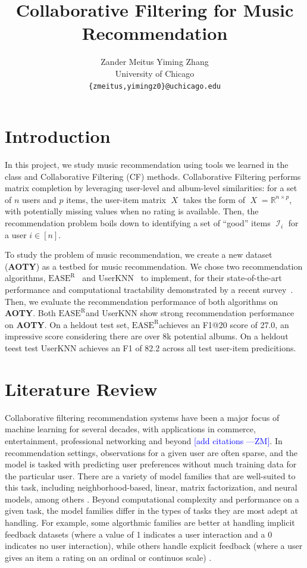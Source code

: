 \documentclass{article}
\title{Collaborative Filtering for Music Recommendation}
\author{
  Zander Meitus \qquad Yiming Zhang \\
  University of Chicago \\
  \texttt{\{zmeitus,yimingz0\}@uchicago.edu}
}
\newcommand{\aoty}{{\bf AOTY}\xspace}
\DeclareMathOperator{\X}{\mathit{X}}
\DeclareMathOperator{\I}{\mathcal{I}}
\newcommand{\easer}{$\text{EASE}^\text{R}$}
\newcommand{\userknn}{UserKNN\xspace}
\newcommand{\zander}[1]{\textcolor{blue}{[#1 ---\textsc{ZM}]}}
\begin{document}
\maketitle

\section{Introduction}

In this project, we study music recommendation using tools we learned in the
 class and Collaborative Filtering (CF) methods.
Collaborative Filtering performs matrix completion by leveraging user-level and
 album-level similarities: for a set of $n$ users and $p$ items, the user-item
 matrix $\X$ takes the form of $\X = \mathbb{R}^{n \times p}$, with potentially
 missing values when no rating is available.
Then, the recommendation problem boils down to identifying a set of ``good''
 items $\I_i$ for a user $i \in [n]$.

To study the problem of music recommendation, we create a new dataset (\aoty)
 as a testbed for music recommendation.
We chose two recommendation algorithms,
 \easer~\citep{steckEmbarrassinglyShallowAutoencoders2019} and
 \userknn~\citep{resnickGroupLensOpenArchitecture1994} to implement, for their
 state-of-the-art performance and computational tractability demonstrated by a
 recent survey~\citep{anelliTopNRecommendationAlgorithms2022}.
Then, we evaluate the recommendation performance of both algorithms on \aoty.
Both \easer and \userknn show strong recommendation performance on \aoty.
On a heldout test set, \easer achieves an F1@20 score of 27.0, an impressive
 score considering there are over 8k potential albums. On a heldout teest test \userknn
 achieves an F1 of 82.2 across all test user-item predicitions. 

\section{Literature Review}
Collaborative filtering recommendation systems have been a major focus of
 machine learning for several decades, with applications in commerce,
 entertainment, professional networking and beyond \zander{add citations}.
In recommendation settings, observations for a given user are often sparse, and
 the model is tasked with predicting user preferences without much training data
 for the particular user.
There are a variety of model families that are well-suited to this task,
 including neighborhood-based, linear, matrix factorization, and neural models,
 among others \citep{anelliTopNRecommendationAlgorithms2022}.
Beyond computational complexity and performance on a given task, the model
 families differ in the types of tasks they are most adept at handling.
For example, some algorthmic families are better at handling implicit feedback
 datasets (where a value of 1 indicates a user interaction and a 0 indicates no
 user interaction), while others handle explicit feedback (where a user gives an
 item a rating on an ordinal or continuos scale)
 \citep{steckEmbarrassinglyShallowAutoencoders2019}.
\end{document}
